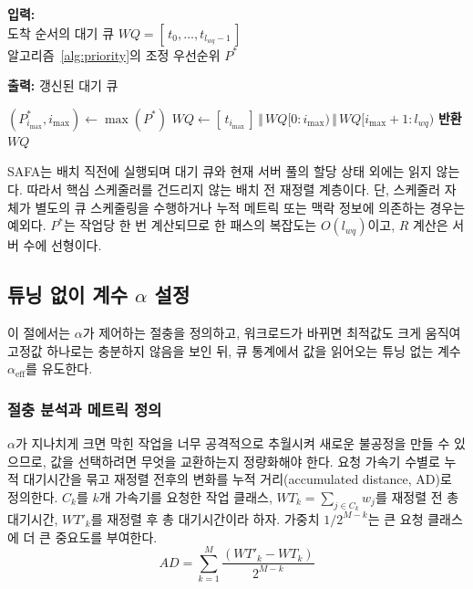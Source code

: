 \documentclass{ieeetj}
\begin{document}
\begin{algorithm}
\caption{SAFA 큐 재정렬}\label{alg:reorder}
\textbf{입력:} \\
\hspace*{4mm} 도착 순서의 대기 큐 $WQ=[\,t_0,\ldots,t_{l_{wq}-1}\,]$ \\
\hspace*{4mm} 알고리즘~\ref{alg:priority}의 조정 우선순위 $P^*$
\begin{flushleft}
\textbf{출력:} 갱신된 대기 큐
\end{flushleft}
\begin{algorithmic}[1]
\STATE $(P_{i_{\max}}^*, i_{\max}) \gets \max(P^*)$
    \STATE $WQ \gets [\,t_{i_{\max}}\,] \,\Vert\, WQ[0{:}i_{\max}) \,\Vert\, WQ[i_{\max}{+}1{:}l_{wq})$ 
\ENDIF
\STATE \textbf{반환} $WQ$
\end{algorithmic}
\end{algorithm}

SAFA는 배치 직전에 실행되며 대기 큐와 현재 서버 풀의 할당 상태 외에는 읽지 않는다. 따라서 핵심 스케줄러를 건드리지 않는 배치 전 재정렬 계층이다. 단, 스케줄러 자체가 별도의 큐 스케줄링을 수행하거나 누적 메트릭 또는 맥락 정보에 의존하는 경우는 예외다. $P^*$는 작업당 한 번 계산되므로 한 패스의 복잡도는 $O(l_{wq})$이고, $R$ 계산은 서버 수에 선형이다.

\subsection{튜닝 없이 계수 $\alpha$ 설정}\label{sec:coeff}
이 절에서는 $\alpha$가 제어하는 절충을 정의하고, 워크로드가 바뀌면 최적값도 크게 움직여 고정값 하나로는 충분하지 않음을 보인 뒤, 큐 통계에서 값을 읽어오는 튜닝 없는 계수 $\alpha_{\text{eff}}$를 유도한다.

\subsubsection{절충 분석과 메트릭 정의}
$\alpha$가 지나치게 크면 막힌 작업을 너무 공격적으로 추월시켜 새로운 불공정을 만들 수 있으므로, 값을 선택하려면 무엇을 교환하는지 정량화해야 한다. 요청 가속기 수별로 누적 대기시간을 묶고 재정렬 전후의 변화를 누적 거리(accumulated distance, AD)로 정의한다. $C_k$를 $k$개 가속기를 요청한 작업 클래스, $WT_k=\sum_{j\in C_k} w_j$를 재정렬 전 총 대기시간, $WT'_k$를 재정렬 후 총 대기시간이라 하자. 가중치 $1/2^{M-k}$는 큰 요청 클래스에 더 큰 중요도를 부여한다.
\begin{equation}
AD = \sum_{k=1}^{M} \frac{(WT'_k - WT_k)}{2^{M-k}}
\label{eq:07}
\end{equation}
\end{document}
